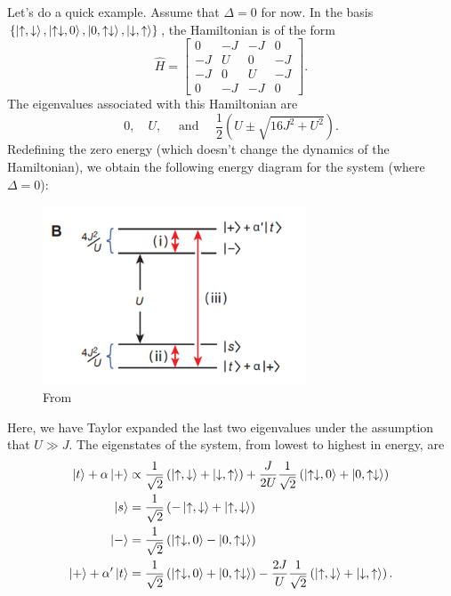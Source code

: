 \documentclass{book}
\theoremstyle{definition}
\newcommand{\al}{\alpha}
\newcommand{\f}[2]{\frac{#1}{#2}}
\newcommand{\lp}{\left(}
\newcommand{\rp}{\right)}
\begin{document}
Let's do a quick example. Assume that $\Delta = 0$ for now. In the basis $\{ 
\ket{\uparrow, \downarrow}, 
\ket{\uparrow\downarrow, 0}, 
\ket{0,\uparrow\downarrow}, 
\ket{\downarrow,\uparrow}\}$, the Hamiltonian is of the form
\begin{equation*}
\widehat{H} = \begin{bmatrix}
0 & -J & -J & 0\\
-J & U & 0& -J\\
-J & 0 & U & -J\\
0& -J &-J  & 0
\end{bmatrix}.
\end{equation*}
The eigenvalues associated with this Hamiltonian are 
\begin{equation*}
0, \quad U, \quad \text{ and }\quad \f{1}{2}\lp U \pm \sqrt{16 J^2+U^2} \rp. 
\end{equation*}
Redefining the zero energy (which doesn't change the dynamics of the Hamiltonian), we obtain the following energy diagram for the system (where $\Delta=0$):
\begin{figure}[!htb]
	\centering
	\includegraphics[width=0.7\textwidth]{images/superex_2}
	\caption{From \cite{trotzky2008time}}
\end{figure}





Here, we have Taylor expanded the last two eigenvalues under the assumption that $U\gg J$. The eigenstates of the system, from lowest to highest in energy, are
\begin{align*} 
\ket{t}+ \al\ket{+} &\propto \f{1}{\sqrt{2}}\lp \ket{\uparrow,\downarrow} + \ket{\downarrow,\uparrow} \rp + \f{J}{2U}\f{1}{\sqrt{2}}\lp \ket{\uparrow\downarrow,0}+ \ket{0,\uparrow\downarrow} \rp  \\
\ket{s} &= \f{1}{\sqrt{2}}\lp -\ket{\uparrow,\downarrow}+ \ket{\uparrow,\downarrow} \rp \\
\ket{-} &=  \f{1}{\sqrt{2}}\lp \ket{\uparrow\downarrow,0} - \ket{0,\uparrow\downarrow} \rp\\
\ket{+} + \al'\ket{t} &= \f{1}{\sqrt{2}}\lp \ket{\uparrow\downarrow,0} + \ket{0,\uparrow\downarrow} \rp - \f{2J}{U}\f{1}{\sqrt{2}}\lp \ket{\uparrow,\downarrow} + \ket{\downarrow,\uparrow} \rp.
\end{align*}
\end{document}
